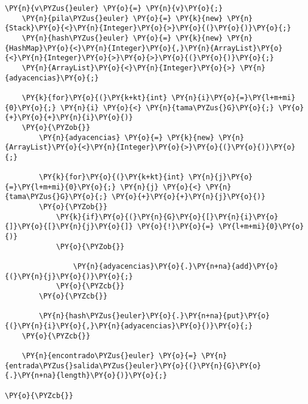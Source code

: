 \begin{Verbatim}[commandchars=\\\{\}]
    \PY{n}{v\PYZus{}euler} \PY{o}{=} \PY{n}{v}\PY{o}{;}
    \PY{n}{pila\PYZus{}euler} \PY{o}{=} \PY{k}{new} \PY{n}{Stack}\PY{o}{<}\PY{n}{Integer}\PY{o}{>}\PY{o}{(}\PY{o}{)}\PY{o}{;}
    \PY{n}{hash\PYZus{}euler} \PY{o}{=} \PY{k}{new} \PY{n}{HashMap}\PY{o}{<}\PY{n}{Integer}\PY{o}{,}\PY{n}{ArrayList}\PY{o}{<}\PY{n}{Integer}\PY{o}{>}\PY{o}{>}\PY{o}{(}\PY{o}{)}\PY{o}{;}
    \PY{n}{ArrayList}\PY{o}{<}\PY{n}{Integer}\PY{o}{>} \PY{n}{adyacencias}\PY{o}{;}

    \PY{k}{for}\PY{o}{(}\PY{k+kt}{int} \PY{n}{i}\PY{o}{=}\PY{l+m+mi}{0}\PY{o}{;} \PY{n}{i} \PY{o}{<} \PY{n}{tama\PYZus{}G}\PY{o}{;} \PY{o}{+}\PY{o}{+}\PY{n}{i}\PY{o}{)}
	\PY{o}{\PYZob{}}
	    \PY{n}{adyacencias} \PY{o}{=} \PY{k}{new} \PY{n}{ArrayList}\PY{o}{<}\PY{n}{Integer}\PY{o}{>}\PY{o}{(}\PY{o}{)}\PY{o}{;}

	    \PY{k}{for}\PY{o}{(}\PY{k+kt}{int} \PY{n}{j}\PY{o}{=}\PY{l+m+mi}{0}\PY{o}{;} \PY{n}{j} \PY{o}{<} \PY{n}{tama\PYZus{}G}\PY{o}{;} \PY{o}{+}\PY{o}{+}\PY{n}{j}\PY{o}{)}
		\PY{o}{\PYZob{}}
		    \PY{k}{if}\PY{o}{(}\PY{n}{G}\PY{o}{[}\PY{n}{i}\PY{o}{]}\PY{o}{[}\PY{n}{j}\PY{o}{]} \PY{o}{!}\PY{o}{=} \PY{l+m+mi}{0}\PY{o}{)}
			\PY{o}{\PYZob{}}

			    \PY{n}{adyacencias}\PY{o}{.}\PY{n+na}{add}\PY{o}{(}\PY{n}{j}\PY{o}{)}\PY{o}{;}
			\PY{o}{\PYZcb{}}
		\PY{o}{\PYZcb{}}

	    \PY{n}{hash\PYZus{}euler}\PY{o}{.}\PY{n+na}{put}\PY{o}{(}\PY{n}{i}\PY{o}{,}\PY{n}{adyacencias}\PY{o}{)}\PY{o}{;}
	\PY{o}{\PYZcb{}}

    \PY{n}{encontrado\PYZus{}euler} \PY{o}{=} \PY{n}{entrada\PYZus{}salida\PYZus{}euler}\PY{o}{(}\PY{n}{G}\PY{o}{.}\PY{n+na}{length}\PY{o}{)}\PY{o}{;}

\PY{o}{\PYZcb{}}
\end{Verbatim}
